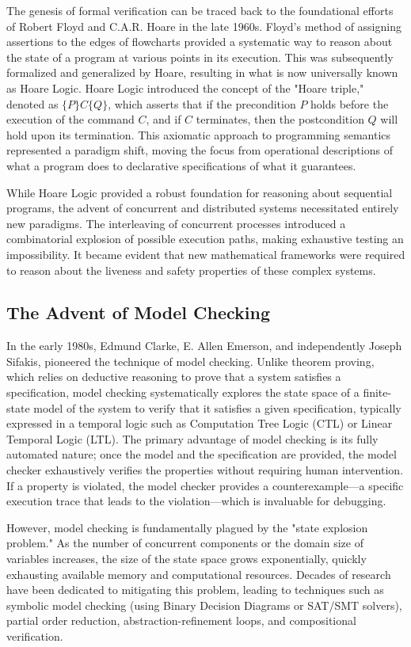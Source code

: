 The genesis of formal verification can be traced back to the foundational efforts of Robert Floyd and C.A.R. Hoare in the late 1960s. Floyd's method of assigning assertions to the edges of flowcharts provided a systematic way to reason about the state of a program at various points in its execution. This was subsequently formalized and generalized by Hoare, resulting in what is now universally known as Hoare Logic. Hoare Logic introduced the concept of the "Hoare triple," denoted as $\{P\} C \{Q\}$, which asserts that if the precondition $P$ holds before the execution of the command $C$, and if $C$ terminates, then the postcondition $Q$ will hold upon its termination. This axiomatic approach to programming semantics represented a paradigm shift, moving the focus from operational descriptions of what a program does to declarative specifications of what it guarantees.

While Hoare Logic provided a robust foundation for reasoning about sequential programs, the advent of concurrent and distributed systems necessitated entirely new paradigms. The interleaving of concurrent processes introduced a combinatorial explosion of possible execution paths, making exhaustive testing an impossibility. It became evident that new mathematical frameworks were required to reason about the liveness and safety properties of these complex systems.

\subsection{The Advent of Model Checking}

In the early 1980s, Edmund Clarke, E. Allen Emerson, and independently Joseph Sifakis, pioneered the technique of model checking. Unlike theorem proving, which relies on deductive reasoning to prove that a system satisfies a specification, model checking systematically explores the state space of a finite-state model of the system to verify that it satisfies a given specification, typically expressed in a temporal logic such as Computation Tree Logic (CTL) or Linear Temporal Logic (LTL). The primary advantage of model checking is its fully automated nature; once the model and the specification are provided, the model checker exhaustively verifies the properties without requiring human intervention. If a property is violated, the model checker provides a counterexample---a specific execution trace that leads to the violation---which is invaluable for debugging.

However, model checking is fundamentally plagued by the "state explosion problem." As the number of concurrent components or the domain size of variables increases, the size of the state space grows exponentially, quickly exhausting available memory and computational resources. Decades of research have been dedicated to mitigating this problem, leading to techniques such as symbolic model checking (using Binary Decision Diagrams or SAT/SMT solvers), partial order reduction, abstraction-refinement loops, and compositional verification.

